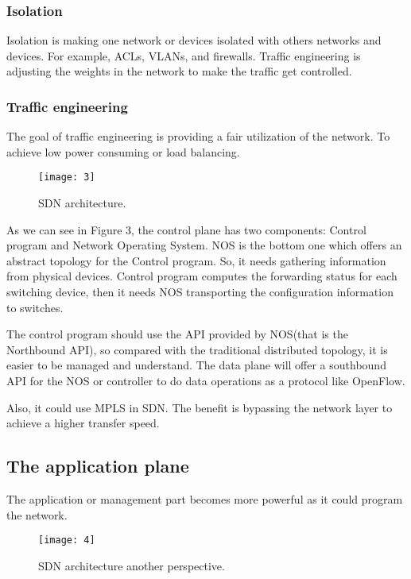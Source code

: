 \documentclass[conference]{IEEEtran}
\begin{document}
\subsubsection{Isolation}
Isolation is making one network or devices isolated with others networks and devices. For example, ACLs, VLANs, and firewalls. Traffic engineering is adjusting the weights in the network to make the traffic get controlled.
\subsubsection{Traffic engineering}
The goal of traffic engineering is providing a fair utilization of the network. To achieve low power consuming or load balancing.

\begin{figure}[!t]
\centering
\texttt{[image: 3]}
\caption{SDN architecture.}
\end{figure}

As we can see in Figure 3, the control plane has two components: Control program and Network Operating System. NOS is the bottom one which offers an abstract topology for the Control program. So, it needs gathering information from physical devices. Control program computes the forwarding status for each switching device, then it needs NOS transporting the configuration information to switches.

The control program should use the API provided by NOS(that is the Northbound API), so compared with the traditional distributed topology, it is easier to be managed and understand. The data plane will offer a southbound API for the NOS or controller to do data operations as a protocol like OpenFlow.

Also, it could use MPLS in SDN. The benefit is bypassing the network layer to achieve a higher transfer speed.

\subsection{The application plane}
The application or management part becomes more powerful as it could program the network.
\begin{figure}[!t]
\centering
\texttt{[image: 4]}
\caption{SDN architecture another perspective.}
\end{figure}
\end{document}
